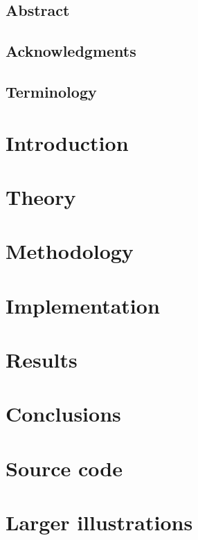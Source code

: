 \documentclass{report}
\begin{document}
\pagestyle{fancy}
\fancyhead{}
\fancyhead[R]{\today}
\fancyfoot[C]{\thepage}

\section*{\hspace*{35pt}\Huge{Abstract}}
    

\newpage

\section*{\hspace*{35pt}\Huge{Acknowledgments}}

\newpage
{
\sffamily\tableofcontents
}
\newpage
\section*{\hspace*{35pt}\Huge{Terminology}}


\newpage
{}
\chapter{Introduction}
    
    \newpage
\chapter{Theory}
    
    \newpage
\chapter{Methodology}
    
    \newpage
\chapter{Implementation}
    
    \newpage
\chapter{Results}
    
    \newpage
\chapter{Conclusions}
    


\newpage
\renewcommand{\bibname}{References}
 


\appendix
\begin{appendices}
  \chapter{Source code}
  
  \chapter{Larger illustrations}
  
\end{appendices}
\end{document}
